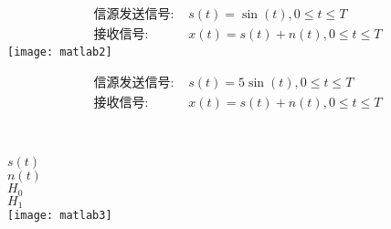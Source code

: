 \begin{frame}[shrink]
\begin{align*}
\text{信源发送信号: } &s(t)=\sin(t),0 \le t\le T\\
\text{接收信号: } &x(t)=s(t)+n(t), 0\le t\le T
\end{align*}
\centering
\texttt{[image: matlab2]}
\end{frame}

\begin{frame}[shrink]
\begin{align*}
\text{信源发送信号: } &s(t)=5\sin(t),0 \le t\le T\\
\text{接收信号: } &x(t)=s(t)+n(t), 0\le t\le T
\end{align*}
\begin{columns}%
	~\\
	\vspace{0.2cm}
	$s(t)$\\
	\vspace{0.5cm}
	$n(t)$\\
	\vspace{0.5cm}
	$H_0$\\
	\vspace{0.5cm}
	$H_1$\\
	\texttt{[image: matlab3]}
\end{columns}
\end{frame}

